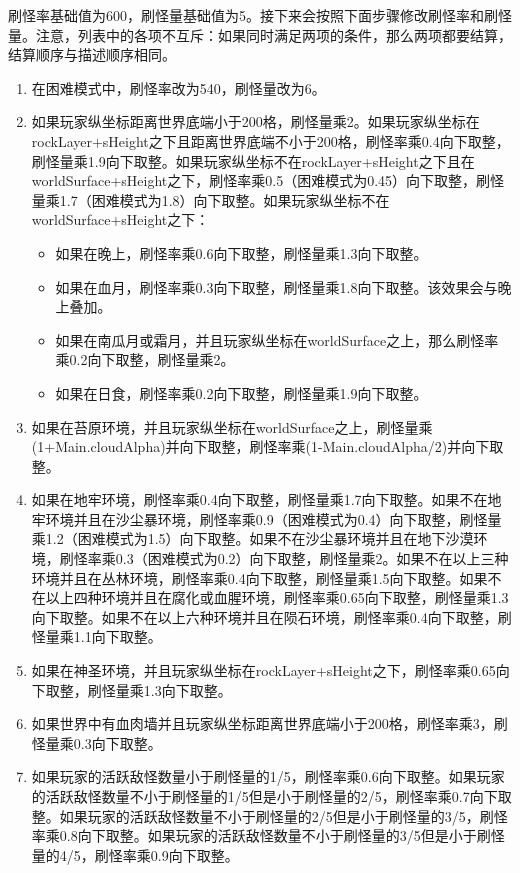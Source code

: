 刷怪率基础值为600，刷怪量基础值为5。接下来会按照下面步骤修改刷怪率和刷怪量。注意，列表中的各项不互斥：如果同时满足两项的条件，那么两项都要结算，结算顺序与描述顺序相同。
\begin{enumerate}
    \item 在困难模式中，刷怪率改为540，刷怪量改为6。
    \item 如果玩家纵坐标距离世界底端小于200格，刷怪量乘2。如果玩家纵坐标在rockLayer+sHeight之下且距离世界底端不小于200格，刷怪率乘0.4向下取整，刷怪量乘1.9向下取整。如果玩家纵坐标不在rockLayer+sHeight之下且在worldSurface+sHeight之下，刷怪率乘0.5（困难模式为0.45）向下取整，刷怪量乘1.7（困难模式为1.8）向下取整。如果玩家纵坐标不在worldSurface+sHeight之下：\begin{itemize}
        \item 如果在晚上，刷怪率乘0.6向下取整，刷怪量乘1.3向下取整。
        \item 如果在血月，刷怪率乘0.3向下取整，刷怪量乘1.8向下取整。该效果会与晚上叠加。
        \item 如果在南瓜月或霜月，并且玩家纵坐标在worldSurface之上，那么刷怪率乘0.2向下取整，刷怪量乘2。
        \item 如果在日食，刷怪率乘0.2向下取整，刷怪量乘1.9向下取整。
    \end{itemize}
    \item 如果在苔原环境，并且玩家纵坐标在worldSurface之上，刷怪量乘(1+Main.cloudAlpha)并向下取整，刷怪率乘(1-Main.cloudAlpha/2)并向下取整。
    \item 如果在地牢环境，刷怪率乘0.4向下取整，刷怪量乘1.7向下取整。如果不在地牢环境并且在沙尘暴环境，刷怪率乘0.9（困难模式为0.4）向下取整，刷怪量乘1.2（困难模式为1.5）向下取整。如果不在沙尘暴环境并且在地下沙漠环境，刷怪率乘0.3（困难模式为0.2）向下取整，刷怪量乘2。如果不在以上三种环境并且在丛林环境，刷怪率乘0.4向下取整，刷怪量乘1.5向下取整。如果不在以上四种环境并且在腐化或血腥环境，刷怪率乘0.65向下取整，刷怪量乘1.3向下取整。如果不在以上六种环境并且在陨石环境，刷怪率乘0.4向下取整，刷怪量乘1.1向下取整。
    \item 如果在神圣环境，并且玩家纵坐标在rockLayer+sHeight之下，刷怪率乘0.65向下取整，刷怪量乘1.3向下取整。
    \item 如果世界中有血肉墙并且玩家纵坐标距离世界底端小于200格，刷怪率乘3，刷怪量乘0.3向下取整。
    \item 如果玩家的活跃敌怪数量小于刷怪量的1/5，刷怪率乘0.6向下取整。如果玩家的活跃敌怪数量不小于刷怪量的1/5但是小于刷怪量的2/5，刷怪率乘0.7向下取整。如果玩家的活跃敌怪数量不小于刷怪量的2/5但是小于刷怪量的3/5，刷怪率乘0.8向下取整。如果玩家的活跃敌怪数量不小于刷怪量的3/5但是小于刷怪量的4/5，刷怪率乘0.9向下取整。

\end{enumerate}

